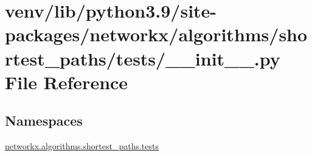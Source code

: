 \hypertarget{venv_2lib_2python3_89_2site-packages_2networkx_2algorithms_2shortest__paths_2tests_2____init_____8py}{}\section{venv/lib/python3.9/site-\/packages/networkx/algorithms/shortest\+\_\+paths/tests/\+\_\+\+\_\+init\+\_\+\+\_\+.py File Reference}
\label{venv_2lib_2python3_89_2site-packages_2networkx_2algorithms_2shortest__paths_2tests_2____init_____8py}
\subsection*{Namespaces}
\begin{DoxyCompactItemize}
\item 
 \hyperlink{namespacenetworkx_1_1algorithms_1_1shortest__paths_1_1tests}{networkx.\+algorithms.\+shortest\+\_\+paths.\+tests}
\end{DoxyCompactItemize}
